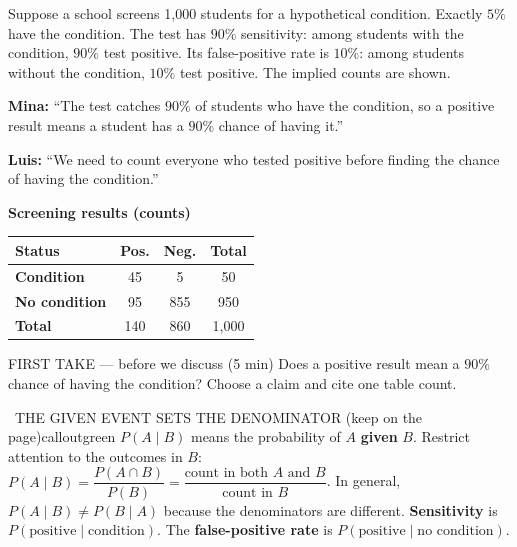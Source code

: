 \documentclass[11pt]{article}
\begin{document}


Suppose a school screens 1{,}000 students for a hypothetical condition. Exactly $5\%$ have the condition. The test has $90\%$ sensitivity: among students with the condition, $90\%$ test positive. Its false-positive rate is $10\%$: among students without the condition, $10\%$ test positive. The implied counts are shown.\par\smallskip \textbf{Mina:} ``The test catches $90\%$ of students who have the condition, so a positive result means a student has a $90\%$ chance of having it.''\par \textbf{Luis:} ``We need to count everyone who tested positive before finding the chance of having the condition.''\par
\begin{center}
\textbf{Screening results (counts)}\par\smallskip
\begin{tabular}{|l|c|c|c|}
\hline
\textbf{Status} & \textbf{Pos.} & \textbf{Neg.} & \textbf{Total} \\ \hline
\textbf{Condition} & 45 & 5 & 50 \\ \hline
\textbf{No condition} & 95 & 855 & 950 \\ \hline
\textbf{Total} & 140 & 860 & 1{,}000 \\ \hline
\end{tabular}
\end{center}
\begin{firsttakebox}{FIRST TAKE --- before we discuss (5 min)}
Does a positive result mean a $90\%$ chance of having the condition? Choose a claim and cite one table count.
\workspace{0.9in}
\end{firsttakebox}

\begin{callout}{\IconBook\ THE GIVEN EVENT SETS THE DENOMINATOR (keep on the page)}{calloutgreen}
$P(A\mid B)$ means the probability of $A$ \textbf{given} $B$. Restrict attention to the outcomes in $B$:
$P(A\mid B)=\dfrac{P(A\cap B)}{P(B)}=\dfrac{\text{count in both }A\text{ and }B}{\text{count in }B}$.
In general, $P(A\mid B)\neq P(B\mid A)$ because the denominators are different.
\textbf{Sensitivity} is $P(\text{positive}\mid\text{condition})$.
The \textbf{false-positive rate} is $P(\text{positive}\mid\text{no condition})$.
\end{callout}
\end{document}
